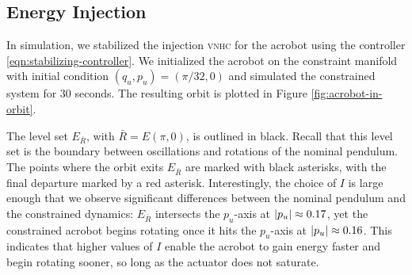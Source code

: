 \documentclass[journal,twoside,web, twocolumn]{ieeecolor}
\DeclarePairedDelimiter{\abs}{\lvert}{\rvert}
\newcommand*{\vnhc}{\textsc{vnhc}\xspace}
\begin{document}
\begin{table}
    \centering
    \caption{Physical parameters for the real acrobot.}
    \label{tab:acrobot-parameters}
\end{table}

\subsection{Energy Injection}

In simulation, we stabilized the injection \vnhc for the acrobot using the
controller \eqref{eqn:stabilizing-controller}.
We initialized the acrobot on the constraint manifold
with initial condition \((q_u,p_u) = \left(\pi/32,0 \right)\) and simulated the
constrained system for \(30\) seconds.
The resulting orbit is plotted in Figure
\ref{fig:acrobot-in-orbit}.

The level set \(E_{\bar R}\), with \(\bar R=E(\pi,0)\), is outlined in black.
Recall that this level set is the boundary between oscillations and rotations of the
nominal pendulum.
The points where the orbit exits \(E_{\bar R}\) are marked with black asterisks,
with the final departure marked by a red asterisk.
Interestingly, the choice of \(I\) is large enough that we observe significant
differences between the nominal pendulum and the constrained dynamics:
\(E_{\bar R}\) intersects the \(p_u\)-axis at \(\abs{p_u} \approx 0.17\), yet the
constrained acrobot begins rotating once it hits the
\(p_u\)-axis at \(\abs{p_u} \approx 0.16\). 
This indicates that higher values of \(I\) enable the acrobot to gain energy
faster and begin rotating sooner, so long as the actuator does not saturate.
\end{document}
